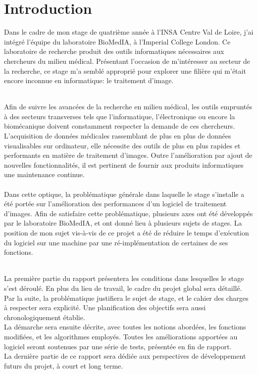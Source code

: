 \documentclass[10pt]{report}
\begin{document}
\chapter*{Introduction}
Dans le cadre de mon stage de quatrième année à l'INSA Centre Val de Loire, j'ai intégré l'équipe du laboratoire BioMedIA, à l'Imperial College London. Ce laboratoire de recherche produit des outils informatiques nécessaires aux chercheurs du milieu médical. Présentant l'occasion de m'intéresser au secteur de la recherche, ce stage m'a semblé approprié pour explorer une filière qui m'était encore inconnue en informatique: le traitement d'image.\\ ~\par  \noindent
Afin de suivre les avancées de la recherche en milieu médical, les outils empruntés à des secteurs transverses tels que l'informatique, l'électronique ou encore la biomécanique doivent constamment respecter la demande de ces chercheurs. L'acquisition de données médicales rassemblant de plus en plus de données visualisables sur ordinateur, elle nécessite des outils de plus en plus rapides et performants en matière de traitement d'images. Outre l'amélioration par ajout de nouvelles fonctionnalités, il est pertinent de fournir aux produits informatiques une maintenance continue.\\   \noindent 
\\Dans cette optique, la problématique générale dans laquelle le stage s'installe a été portée sur l'amélioration des performances d'un logiciel de traitement d'images. Afin de satisfaire cette problématique, plusieurs axes ont été développés par le laboratoire BioMedIA, et ont donné lieu à plusieurs sujets de stages. La position de mon sujet vis-à-vis de ce projet a été de réduire le temps d'exécution du logiciel sur une machine par une ré-implémentation de certaines de ses fonctions.  \\ ~\par
\noindent
La première partie du rapport présentera les conditions dans lesquelles le stage s'est déroulé. En plus du lieu de travail, le cadre du projet global sera détaillé.\\
Par la suite, la problématique justifiera le sujet de stage, et le cahier des charges à respecter sera explicité. Une planification des objectifs sera aussi chronologiquement établie.\\
La démarche sera ensuite décrite, avec toutes les notions abordées, les fonctions modifiées, et les algorithmes employés. Toutes les améliorations apportées au logiciel seront soutenues par une série de tests, présentée en fin de rapport.\\
La dernière partie de ce rapport sera dédiée aux perspectives de développement futurs du projet, à court et long terme.
\end{document}
